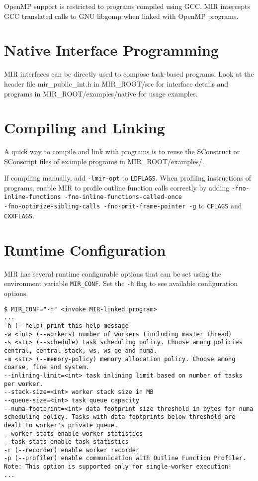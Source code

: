 \documentclass[11pt,a4paper]{article}
\begin{document}
OpenMP support is restricted to programs compiled using GCC. MIR intercepts GCC translated calls to GNU libgomp when linked with OpenMP programs.

\section{Native Interface Programming}\label{sec:native-interface-programming}

MIR interfaces can be directly used to compose task-based programs. Look at the header file \textsf{mir\_public\_int.h} in \textsf{MIR\_ROOT/src} for interface details and programs in \textsf{MIR\_ROOT/examples/native} for usage examples.

\section{Compiling and Linking}\label{sec:compiling-and-linking}

A quick way to compile and link with programs is to reuse the \textsf{SConstruct} or \textsf{SConscript} files of example programs in \textsf{MIR\_ROOT/examples/}.

If compiling manually, add \texttt{-lmir-opt} to \texttt{LDFLAGS}. When profiling instructions of programs, enable MIR to profile outline function calls correctly by adding \texttt{{\footnotesize -fno-inline-functions -fno-inline-functions-called-once \\ -fno-optimize-sibling-calls -fno-omit-frame-pointer -g}}  to \texttt{CFLAGS} and \\\texttt{CXXFLAGS}.

\section{Runtime Configuration}\label{sec:runtime-configuration}

MIR has several runtime configurable options that can be set using the environment variable \texttt{MIR\_CONF}. Set the \texttt{-h} flag to see available configuration options.

\begin{lstlisting}[style=MyInputStyle]
$ MIR_CONF="-h" <invoke MIR-linked program>
...
-h (--help) print this help message
-w <int> (--workers) number of workers (including master thread)
-s <str> (--schedule) task scheduling policy. Choose among policies central, central-stack, ws, ws-de and numa.
-m <str> (--memory-policy) memory allocation policy. Choose among coarse, fine and system.
--inlining-limit=<int> task inlining limit based on number of tasks per worker.
--stack-size=<int> worker stack size in MB
--queue-size=<int> task queue capacity
--numa-footprint=<int> data footprint size threshold in bytes for numa scheduling policy. Tasks with data footprints below threshold are dealt to worker's private queue.
--worker-stats enable worker statistics
--task-stats enable task statistics
-r (--recorder) enable worker recorder
-p (--profiler) enable communication with Outline Function Profiler. Note: This option is supported only for single-worker execution!
...
\end{lstlisting}
\end{document}
